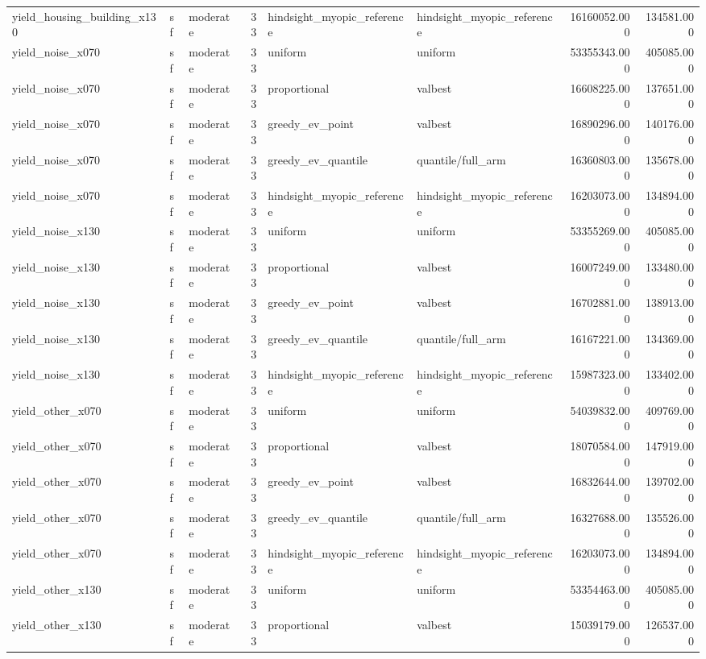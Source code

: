 \begin{tabular}{lllrllrr}
yield\_housing\_building\_x130 & sf & moderate & 33 & hindsight\_myopic\_reference & hindsight\_myopic\_reference & 16160052.000 & 134581.000 \\
yield\_noise\_x070 & sf & moderate & 33 & uniform & uniform & 53355343.000 & 405085.000 \\
yield\_noise\_x070 & sf & moderate & 33 & proportional & valbest & 16608225.000 & 137651.000 \\
yield\_noise\_x070 & sf & moderate & 33 & greedy\_ev\_point & valbest & 16890296.000 & 140176.000 \\
yield\_noise\_x070 & sf & moderate & 33 & greedy\_ev\_quantile & quantile/full\_arm & 16360803.000 & 135678.000 \\
yield\_noise\_x070 & sf & moderate & 33 & hindsight\_myopic\_reference & hindsight\_myopic\_reference & 16203073.000 & 134894.000 \\
yield\_noise\_x130 & sf & moderate & 33 & uniform & uniform & 53355269.000 & 405085.000 \\
yield\_noise\_x130 & sf & moderate & 33 & proportional & valbest & 16007249.000 & 133480.000 \\
yield\_noise\_x130 & sf & moderate & 33 & greedy\_ev\_point & valbest & 16702881.000 & 138913.000 \\
yield\_noise\_x130 & sf & moderate & 33 & greedy\_ev\_quantile & quantile/full\_arm & 16167221.000 & 134369.000 \\
yield\_noise\_x130 & sf & moderate & 33 & hindsight\_myopic\_reference & hindsight\_myopic\_reference & 15987323.000 & 133402.000 \\
yield\_other\_x070 & sf & moderate & 33 & uniform & uniform & 54039832.000 & 409769.000 \\
yield\_other\_x070 & sf & moderate & 33 & proportional & valbest & 18070584.000 & 147919.000 \\
yield\_other\_x070 & sf & moderate & 33 & greedy\_ev\_point & valbest & 16832644.000 & 139702.000 \\
yield\_other\_x070 & sf & moderate & 33 & greedy\_ev\_quantile & quantile/full\_arm & 16327688.000 & 135526.000 \\
yield\_other\_x070 & sf & moderate & 33 & hindsight\_myopic\_reference & hindsight\_myopic\_reference & 16203073.000 & 134894.000 \\
yield\_other\_x130 & sf & moderate & 33 & uniform & uniform & 53354463.000 & 405085.000 \\
yield\_other\_x130 & sf & moderate & 33 & proportional & valbest & 15039179.000 & 126537.000 \\

\end{tabular}
